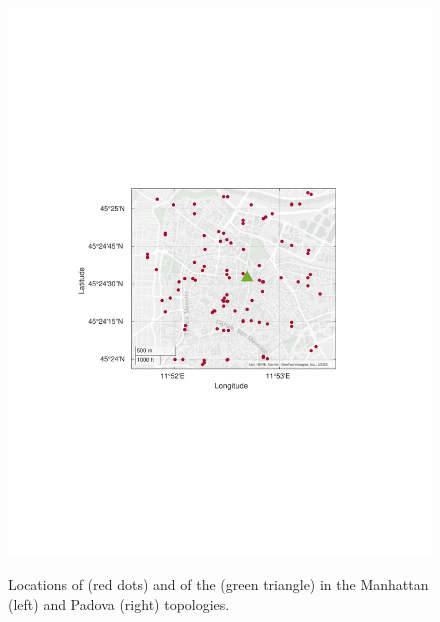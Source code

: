 \begin{figure}
{\includegraphics[scale=0.45]{Figures/Safehaul/padova_new.pdf}
    \label{fig:Padova_Map}}
    \caption{Locations of \nodes{} (red dots) and of the \donor{} (green triangle) in the Manhattan (left) and Padova (right) topologies.}
\end{figure}


